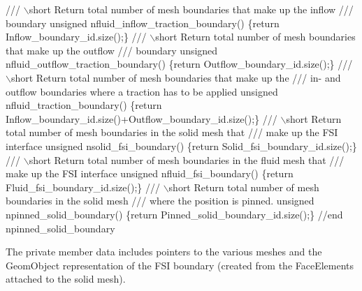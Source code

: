 \begin{DoxyCodeInclude}
 \textcolor{comment}{}
\textcolor{comment}{ /// \(\backslash\)short Return total number of mesh boundaries that make up the inflow }
\textcolor{comment}{ /// boundary}
\textcolor{comment}{} \textcolor{keywordtype}{unsigned} nfluid\_inflow\_traction\_boundary()
  \{\textcolor{keywordflow}{return} Inflow\_boundary\_id.size();\}
\textcolor{comment}{}
\textcolor{comment}{ ///  \(\backslash\)short Return total number of mesh boundaries that make up the outflow }
\textcolor{comment}{ /// boundary}
\textcolor{comment}{} \textcolor{keywordtype}{unsigned} nfluid\_outflow\_traction\_boundary()
  \{\textcolor{keywordflow}{return} Outflow\_boundary\_id.size();\}
\textcolor{comment}{}
\textcolor{comment}{ /// \(\backslash\)short Return total number of mesh boundaries that make up the }
\textcolor{comment}{ /// in- and outflow boundaries where a traction has to be applied}
\textcolor{comment}{} \textcolor{keywordtype}{unsigned} nfluid\_traction\_boundary()
  \{\textcolor{keywordflow}{return} Inflow\_boundary\_id.size()+Outflow\_boundary\_id.size();\}
\textcolor{comment}{}
\textcolor{comment}{ /// \(\backslash\)short Return total number of mesh boundaries in the solid mesh that}
\textcolor{comment}{ /// make up the FSI interface}
\textcolor{comment}{} \textcolor{keywordtype}{unsigned} nsolid\_fsi\_boundary()
  \{\textcolor{keywordflow}{return} Solid\_fsi\_boundary\_id.size();\}
\textcolor{comment}{}
\textcolor{comment}{ /// \(\backslash\)short Return total number of mesh boundaries in the fluid mesh that}
\textcolor{comment}{ /// make up the FSI interface}
\textcolor{comment}{} \textcolor{keywordtype}{unsigned} nfluid\_fsi\_boundary()
  \{\textcolor{keywordflow}{return} Fluid\_fsi\_boundary\_id.size();\}
\textcolor{comment}{}
\textcolor{comment}{ /// \(\backslash\)short Return total number of mesh boundaries in the solid mesh }
\textcolor{comment}{ /// where the position is pinned.}
\textcolor{comment}{} \textcolor{keywordtype}{unsigned} npinned\_solid\_boundary()
  \{\textcolor{keywordflow}{return} Pinned\_solid\_boundary\_id.size();\} 
  \textcolor{comment}{//end npinned\_solid\_boundary}

\end{DoxyCodeInclude}


The private member data includes pointers to the various meshes and the {\ttfamily Geom\+Object} representation of the F\+SI boundary (created from the {\ttfamily Face\+Elements} attached to the solid mesh).


